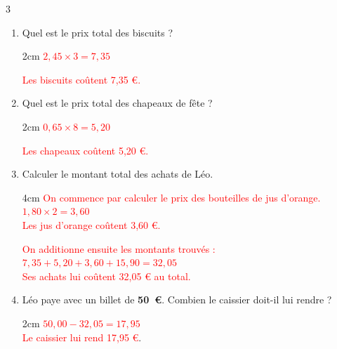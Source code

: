 \documentclass[a4paper]{book}
\begin{document}
{\begin{exerciceNote}{3}
        \medskip
        
        \begin{enumerate}
            \item Quel est le prix total des biscuits ? 
            
            \begin{ZoneReponse}{2cm}
                \quad \textcolor{red}{$2,45\times3=7,35$}

                \textcolor{red}{Les biscuits coûtent 7,35 €.}
            \end{ZoneReponse}


\newpage

                 
            \item Quel est le prix total des chapeaux de fête ?  

            \begin{ZoneReponse}{2cm}
                \quad \textcolor{red}{$0,65\times8=5,20$}

                \textcolor{red}{Les chapeaux coûtent 5,20 €.}  
            \end{ZoneReponse}
                
            \item Calculer le montant total des achats de Léo.
            
            \begin{ZoneReponse}{4cm}
                \quad \textcolor{red}{On commence par calculer le prix des bouteilles de jus d'orange.}\\
                \textcolor{red}{$1,80\times2=3,60$}\\
                \textcolor{red}{Les jus d'orange coûtent 3,60 €.}

                \medskip

                \textcolor{red}{On additionne ensuite les montants trouvés :}\\
                \textcolor{red}{$7,35+5,20+3,60+15,90=32,05$}\\
                \textcolor{red}{Ses achats lui coûtent 32,05 € au total.}
            \end{ZoneReponse}

            \item Léo paye avec un billet de \textbf{50~\euro{}}. Combien le caissier doit-il lui rendre ? 
            
            \begin{ZoneReponse}{2cm}
                \quad \textcolor{red}{$50,00-32,05=17,95$}\\
                \textcolor{red}{Le caissier lui rend 17,95 €}.
            \end{ZoneReponse}
        \end{enumerate}
    \end{exerciceNote}


}
\end{document}
